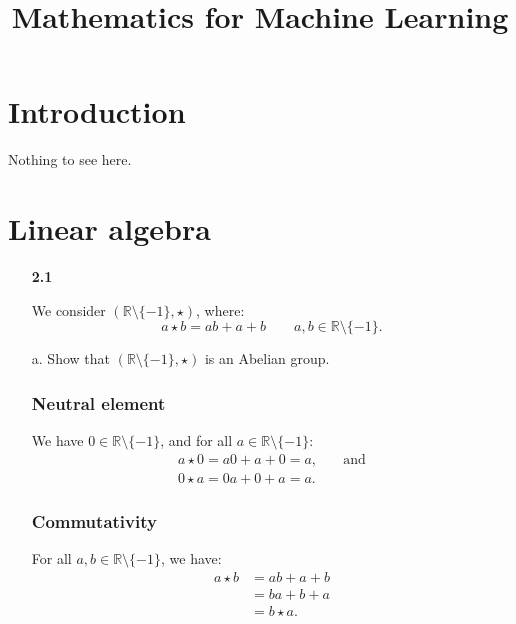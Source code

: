 \documentclass[11pt]{article}
\title{Mathematics for Machine Learning}
\author{}
\date{}
\newcommand{\R}{\mathbb{R}}
\theoremstyle{definition}
\theoremstyle{plain}
\theoremstyle{remark}
\begin{document}
\maketitle
\vspace{1em}

\section{Introduction}

Nothing to see here.

\section{Linear algebra}

\begin{enumerate}

    \item[\textbf{2.1}]

          We consider \(\left(\R \setminus \{-1\}, \star \right)\), where:
          \[
              a \star b = ab + a + b \qquad a, b \in \R \setminus \{-1\}.
          \]

    \item[a.] Show that \(\left(\R \setminus \{-1\}, \star \right)\) is an Abelian group.

          \subsubsection*{Neutral element}

          We have \( 0 \in \R \setminus \{-1\} \), and for all \(a \in \R \setminus \{-1\}\):
          \[
              \begin{aligned}
                  a \star 0 = a0 + a + 0 = a, & \quad \textrm{and} \\
                  0 \star a = 0a + 0 + a = a.
              \end{aligned}
          \]

          \subsubsection*{Commutativity}

          For all \(a, b \in \R \setminus \{-1\}\), we have:
          \[
              \begin{aligned}
                  a \star b & = ab + a + b \\
                            & = ba + b + a \\
                            & = b \star a.
              \end{aligned}
          \]


\end{enumerate}
\end{document}
